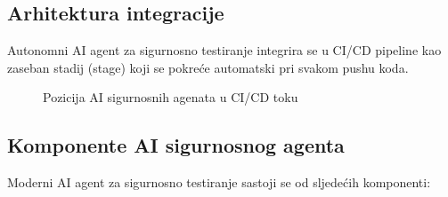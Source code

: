 \documentclass[12pt,a4paper]{article}
\begin{document}
\subsection{Arhitektura integracije}

Autonomni AI agent za sigurnosno testiranje integrira se u CI/CD pipeline kao zaseban stadij (stage) koji se pokreće automatski pri svakom pushu koda.

\begin{figure}[H]
\centering
{}
\caption{Pozicija AI sigurnosnih agenata u CI/CD toku}
\end{figure}

\subsection{Komponente AI sigurnosnog agenta}

Moderni AI agent za sigurnosno testiranje sastoji se od sljedećih komponenti:
\end{document}
